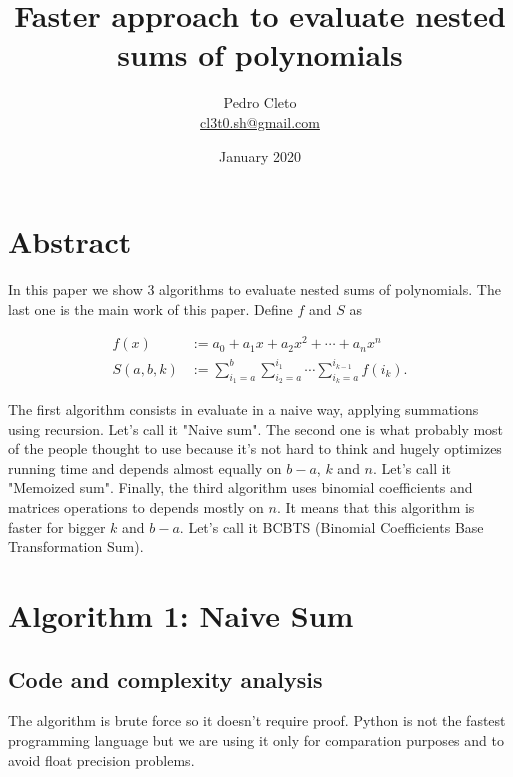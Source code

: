\documentclass[12pt]{article}
\title{Faster approach to evaluate nested sums of polynomials}
\author{Pedro Cleto \\ \href{mailto:cl3t0.sh@gmail.com}{cl3t0.sh@gmail.com} }
\date{January 2020}
\begin{document}
\newtheorem{theorem}{Theorem}
\newtheorem{corollary}{Corollary}[theorem]
\newtheorem{lemma}[theorem]{Lemma}

\maketitle

\section{Abstract}

In this paper we show 3 algorithms to evaluate nested sums of polynomials. The last one is the main work of this paper. Define $f$ and $S$ as

\begin{align*}
    f(x)       & := a_0 + a_1 x + a_2 x^2 + \cdots + a_n x^n                               \\
    S(a, b, k) & := \sum_{i_1=a}^{b}\sum_{i_2=a}^{i_1}\cdots\sum_{i_k=a}^{i_{k-1}} f(i_k).
\end{align*}

The first algorithm consists in evaluate in a naive way, applying summations using recursion. Let's call it "Naive sum". The second one is what probably most of the people thought to use because it's not hard to think and hugely optimizes running time and depends almost equally on $b - a$, $k$ and $n$. Let's call it "Memoized sum". Finally, the third algorithm uses binomial coefficients and matrices operations to depends mostly on $n$. It means that this algorithm is faster for bigger $k$ and $b - a$. Let's call it BCBTS (Binomial Coefficients Base Transformation Sum).

\section{Algorithm 1: Naive Sum}

\subsection{Code and complexity analysis}

The algorithm is brute force so it doesn't require proof. Python is not the fastest programming language but we are using it only for comparation purposes and to avoid float precision problems.

\pagebreak
\end{document}

